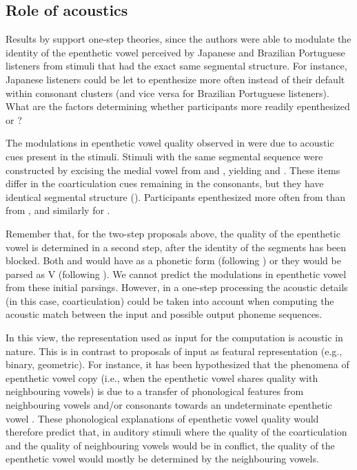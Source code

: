 \subsection{Role of acoustics}
Results by \cite{dupoux2011} support one-step theories, since the authors were able to modulate the identity of the epenthetic vowel perceived by Japanese and Brazilian Portuguese listeners from stimuli that had the exact same segmental structure. For instance, Japanese listeners could be let to epenthesize  more often instead of their default  within consonant clusters (and vice versa for Brazilian Portuguese listeners). What are the factors determining whether participants more readily epenthesized  or ?

The modulations in epenthetic vowel quality observed in \cite{dupoux2011} were due to acoustic cues present in the stimuli. Stimuli with the same segmental sequence were constructed by excising the medial vowel from  and , yielding  and . These items differ in the coarticulation cues remaining in the consonants, but they have identical segmental structure (). Participants epenthesized  more often from  than from , and similarly for .

Remember that, for the two-step proposals above, the quality of the epenthetic vowel is determined in a second step, after the identity of the segments has been blocked. Both  and  would have  as a phonetic form (following \cite{berent2007}) or they would be parsed as V (following \cite{monahan2009}). We cannot predict the modulations in epenthetic vowel from these initial parsings. However, in a one-step processing the acoustic details (in this case, coarticulation) could be taken into account when computing the acoustic match between the input and possible output phoneme sequences. 

In this view, the representation used as input for the computation is acoustic in nature. This is in contrast to proposals of input as featural representation (e.g., binary, geometric). For instance, it has been hypothesized that the phenomena of epenthetic vowel copy (i.e., when the epenthetic vowel shares quality with neighbouring vowels) is due to a transfer of phonological features from neighbouring vowels and/or consonants towards an undeterminate epenthetic vowel \cite{rose2006, uffmann2006}. These phonological explanations of epenthetic vowel quality would therefore predict that, in auditory stimuli where the quality of the coarticulation and the quality of neighbouring vowels would be in conflict, the quality of the epenthetic vowel would mostly be determined by the neighbouring vowels.      

